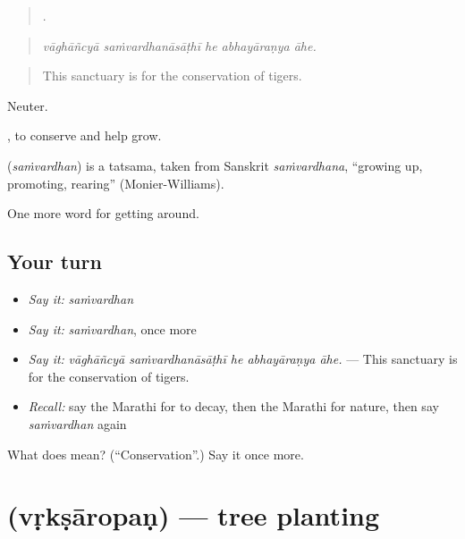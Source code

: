 \begin{quote}
    .
\end{quote}

\begin{quote}
\emph{vāghāñcyā saṁvardhanāsāṭhī he abhayāraṇya āhe.}
\end{quote}

\begin{quote}
This sanctuary is for the conservation of tigers.
\end{quote}

Neuter.

 , to conserve and help grow.

\begin{cousinweb}
\textbf{} (\emph{saṁvardhan}) is a tatsama, taken from Sanskrit \emph{saṁvardhana}, \textquotedblleft{}growing up, promoting, rearing\textquotedblright{} (Monier-Williams).
\end{cousinweb}

\begin{grammarlens}[title={What you've built}]
One more word for getting around.
\end{grammarlens}

\subsection*{Your turn}
\begin{itemize}
\raggedright
  \item \emph{Say it:} \emph{saṁvardhan}
  \item \emph{Say it:} \emph{saṁvardhan}, once more
  \item \emph{Say it:} \emph{vāghāñcyā saṁvardhanāsāṭhī he abhayāraṇya āhe.} — This sanctuary is for the conservation of tigers.
  \item \emph{Recall:} say the Marathi for to decay, then the Marathi for nature, then say \emph{saṁvardhan} again
\end{itemize}

\begin{tcolorbox}[breakable,colback=teal!4,colframe=teal!35!black,title={Before you move on}]
What does  mean? (\textquotedblleft{}Conservation\textquotedblright{}.) Say it once more.
\end{tcolorbox}
\section[\texorpdfstring{\mr{वृक्षारोपण} (vṛkṣāropaṇ)}{वृक्षारोपण (vṛkṣāropaṇ)}]{ (vṛkṣāropaṇ) — tree planting}

